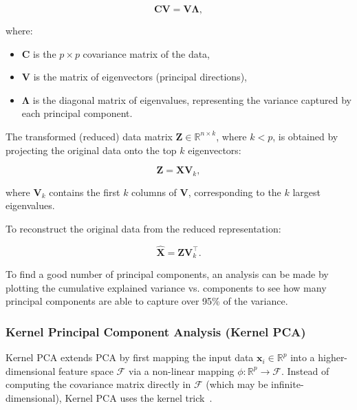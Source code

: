 \documentclass[class=scrbook, crop=false]{standalone}
\begin{document}
	\begin{equation}
		\mathbf{C} \mathbf{V} = \mathbf{V} \boldsymbol{\Lambda},
	\end{equation}
	
	where:
	\begin{itemize}
		\item $\mathbf{C}$ is the $p \times p$ covariance matrix of the data,
		\item $\mathbf{V}$ is the matrix of eigenvectors (principal directions),
		\item $\boldsymbol{\Lambda}$ is the diagonal matrix of eigenvalues, representing the variance captured by each principal component.
	\end{itemize}
	
	The transformed (reduced) data matrix $\mathbf{Z} \in \mathbb{R}^{n \times k}$, where $k < p$, is obtained by projecting the original data onto the top $k$ eigenvectors:
	
	\begin{equation}
		\mathbf{Z} = \mathbf{X} \mathbf{V}_k,
	\end{equation}
	
	where $\mathbf{V}_k$ contains the first $k$ columns of $\mathbf{V}$, corresponding to the $k$ largest eigenvalues.
	
	To reconstruct the original data from the reduced representation:
	
	\begin{equation}
		\hat{\mathbf{X}} = \mathbf{Z} \mathbf{V}_k^\top.
	\end{equation}	
	
	To find a good number of principal components, an analysis can be made by plotting the cumulative explained variance vs. components to see how many principal components are able to capture over 95\% of the variance.
	

	\subsubsection{Kernel Principal Component Analysis (Kernel PCA)}
	
	Kernel PCA extends PCA by first mapping the input data $\mathbf{x}_i \in \mathbb{R}^p$ into a higher-dimensional feature space $\mathcal{F}$ via a non-linear mapping $\phi: \mathbb{R}^p \rightarrow \mathcal{F}$. Instead of computing the covariance matrix directly in $\mathcal{F}$ (which may be infinite-dimensional), Kernel PCA uses the kernel trick~\cite{scholkopf1998nonlinear}.
	
\end{document}
